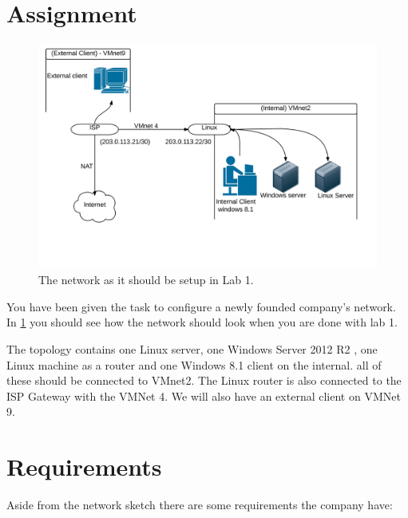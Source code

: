 \documentclass[paper=a4, fontsize=11pt]{report} %
\begin{document}
\section{Assignment}
\begin{figure}[h]
\centering
\includegraphics[width=1\linewidth]{./network}
\caption[Figure over network in Lab 1]{The network as it should be setup in Lab 1.}
\label{fig:network}
\end{figure}
You have been given the task to configure a newly founded company's network. In \figurename \ref{fig:network} you should see how the network should look when you are done with lab 1.

The topology contains one Linux server, one Windows Server 2012 R2 , one Linux machine as a router and one Windows 8.1 client on the internal. all of these should be connected to VMnet2. The Linux router is also connected to the ISP Gateway with the VMNet 4.
We will also have an external client on VMNet 9.

\section{Requirements}
\label{tasks}
Aside from the network sketch there are some requirements the company have:
\end{document}
